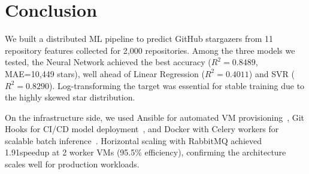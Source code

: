 \section{Conclusion}

We built a distributed ML pipeline to predict GitHub stargazers from 11 repository features collected for 2{,}000 repositories. Among the three models we tested, the Neural Network achieved the best accuracy ($R^2=0.8489$, MAE=10{,}449 stars), well ahead of Linear Regression ($R^2=0.4011$) and SVR ($R^2=0.8290$). Log-transforming the target was essential for stable training due to the highly skewed star distribution.

On the infrastructure side, we used Ansible for automated VM provisioning~\cite{armstrong2015}, Git Hooks for CI/CD model deployment~\cite{qian2020orchestrating}, and Docker with Celery workers for scalable batch inference~\cite{hariri2018}. Horizontal scaling with RabbitMQ achieved 1.91\texttimes speedup at 2 worker VMs (95.5\% efficiency), confirming the architecture scales well for production workloads.
